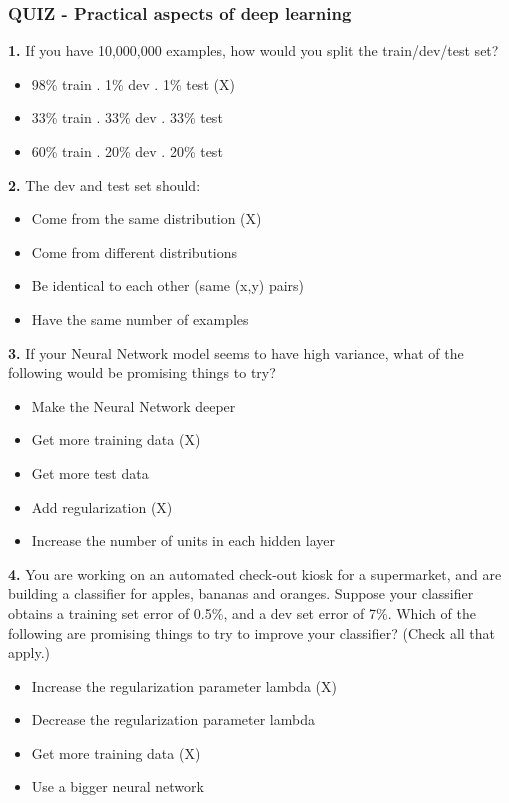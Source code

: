 \subsubsection*{QUIZ - Practical aspects of deep learning}
\textbf{1.} If you have 10,000,000 examples, how would you split the train/dev/test set?
\begin{itemize}
    \item 98\% train . 1\% dev . 1\% test (X)
    \item 33\% train . 33\% dev . 33\% test
    \item 60\% train . 20\% dev . 20\% test
\end{itemize}
\textbf{2.} The dev and test set should:
\begin{itemize}
    \item Come from the same distribution (X)
    \item Come from different distributions
    \item Be identical to each other (same (x,y) pairs)
    \item Have the same number of examples
\end{itemize}
\textbf{3.} If your Neural Network model seems to have high variance, what of the following would be promising things to try?
\begin{itemize}
    \item Make the Neural Network deeper
    \item Get more training data (X)
    \item Get more test data
    \item Add regularization (X)
    \item Increase the number of units in each hidden layer
\end{itemize}
\textbf{4.} You are working on an automated check-out kiosk for a supermarket, and are building a classifier for apples, bananas and oranges. Suppose your classifier obtains a training set error of 0.5\%, and a dev set error of 7\%. Which of the following are promising things to try to improve your classifier? (Check all that apply.)
\begin{itemize}
    \item Increase the regularization parameter lambda (X)
    \item Decrease the regularization parameter lambda
    \item Get more training data (X)
    \item Use a bigger neural network
\end{itemize}
